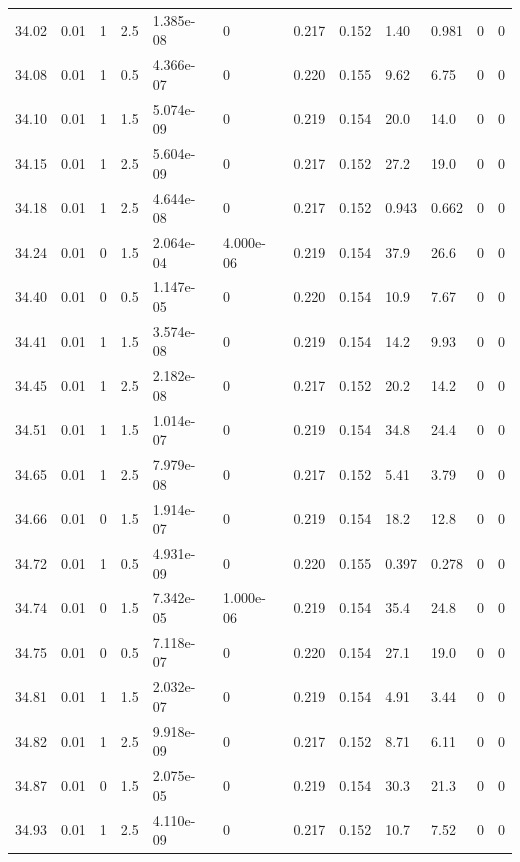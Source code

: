 \documentclass[preview]{standalone}
\begin{document}
{{{{{{{{{{{{{{{{\begin{tabular}{L{1.2cm}C{1.2cm} C{0.3cm}C{0.5cm} C{1.4cm}C{1.4cm} C{1.4cm}C{1.4cm} C{1.6cm}C{1.6cm} C{1.6cm}C{1.6cm}}
  34.02  &  0.01  & 1     & 2.5 &  1.385e-08  & 0  &  0.217&   0.152& 1.40 & 0.981   &  0 & 0  \\ 
  34.08  &  0.01  & 1     & 0.5 &  4.366e-07  & 0  &  0.220&   0.155& 9.62 & 6.75   &  0 & 0  \\ 
  34.10  &  0.01  & 1     & 1.5 &  5.074e-09  & 0  &  0.219&   0.154& 20.0 & 14.0   &  0 & 0  \\ 
  34.15  &  0.01  & 1     & 2.5 &  5.604e-09  & 0  &  0.217&   0.152& 27.2 & 19.0   &  0 & 0  \\ 
  34.18  &  0.01  & 1     & 2.5 &  4.644e-08  & 0  &  0.217&   0.152& 0.943 & 0.662   &  0 & 0  \\ 
  34.24  &  0.01  & 0     & 1.5 &  2.064e-04  & 4.000e-06  &  0.219&   0.154& 37.9 & 26.6   &  0 & 0  \\ 
  34.40  &  0.01  & 0     & 0.5 &  1.147e-05  & 0  &  0.220&   0.154& 10.9 & 7.67   &  0 & 0  \\ 
  34.41  &  0.01  & 1     & 1.5 &  3.574e-08  & 0  &  0.219&   0.154& 14.2 & 9.93   &  0 & 0  \\ 
  34.45  &  0.01  & 1     & 2.5 &  2.182e-08  & 0  &  0.217&   0.152& 20.2 & 14.2   &  0 & 0  \\ 
  34.51  &  0.01  & 1     & 1.5 &  1.014e-07  & 0  &  0.219&   0.154& 34.8 & 24.4   &  0 & 0  \\ 
  34.65  &  0.01  & 1     & 2.5 &  7.979e-08  & 0  &  0.217&   0.152& 5.41 & 3.79   &  0 & 0  \\ 
  34.66  &  0.01  & 0     & 1.5 &  1.914e-07  & 0  &  0.219&   0.154& 18.2 & 12.8   &  0 & 0  \\ 
  34.72  &  0.01  & 1     & 0.5 &  4.931e-09  & 0  &  0.220&   0.155& 0.397 & 0.278   &  0 & 0  \\ 
  34.74  &  0.01  & 0     & 1.5 &  7.342e-05  & 1.000e-06  &  0.219&   0.154& 35.4 & 24.8   &  0 & 0  \\ 
  34.75  &  0.01  & 0     & 0.5 &  7.118e-07  & 0  &  0.220&   0.154& 27.1 & 19.0   &  0 & 0  \\ 
  34.81  &  0.01  & 1     & 1.5 &  2.032e-07  & 0  &  0.219&   0.154& 4.91 & 3.44   &  0 & 0  \\ 
  34.82  &  0.01  & 1     & 2.5 &  9.918e-09  & 0  &  0.217&   0.152& 8.71 & 6.11   &  0 & 0  \\ 
  34.87  &  0.01  & 0     & 1.5 &  2.075e-05  & 0  &  0.219&   0.154& 30.3 & 21.3   &  0 & 0  \\ 
  34.93  &  0.01  & 1     & 2.5 &  4.110e-09  & 0  &  0.217&   0.152& 10.7 & 7.52   &  0 & 0  \\ 

\end{tabular}}}}}}}}}}}}}}}}}
\end{document}
